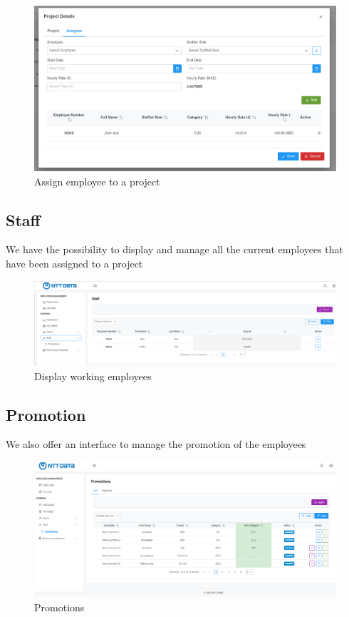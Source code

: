 \documentclass[12pt,a4paper,table,english]{article}
\begin{document}
	\begin{figure}[H]
		\centering
		\includegraphics[width=150mm]{Image/projectassign}
		\caption{Assign employee to a project}
		\label{fig:Assign employee to a project}
	\end{figure}

	\subsection{Staff}
	
	We have the possibility to display and manage all the current employees that have been assigned to a project
	
	\begin{figure}[H]
		\centering
		\includegraphics[width=150mm]{Image/staff}
		\caption{Display working employees}
		\label{fig:Display working employees}
	\end{figure}
	
	\subsection{Promotion}
	
	We also offer an interface to manage the promotion of the employees
	
	\begin{figure}[H]
		\centering
		\includegraphics[width=150mm]{Image/promotion}
		\caption{Promotions}
		\label{fig:Promotions}
	\end{figure}
\end{document}
